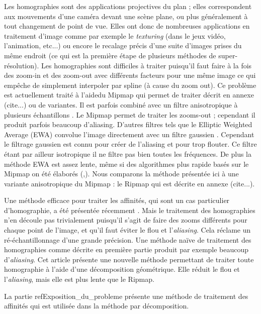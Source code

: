 Les homographies sont des applications projectives du plan ; elles correspondent aux mouvements d'une caméra devant une scène plane, ou plus généralement à tout changement de point de vue. Elles ont donc de nombreuses applications en traitement d'image comme par exemple le \emph{texturing} \cite{heckbert1983texture} (dans le jeux vidéo, l'animation, etc...) ou encore le recalage précis d'une suite d'images prises du même endroit \cite{brown2007automatic} (ce qui est la première étape de plusieurs méthodes de super-résolution). Les homographies sont difficiles à traiter puisqu'il faut faire à la fois des zoom-in et des zoom-out avec différents facteurs pour une même image ce qui empêche de simplement interpoler par spline (à cause du zoom out).  Ce problème est actuellement traité à l'aidedu Mipmap qui permet de traiter \cite{williams1983pyramidal} décrit en annexe (cite...) ou de variantes. Il est parfois combiné avec un filtre anisotropique à plusieurs échantillons  \cite{barkans1997high}. Le Mipmap permet de traiter les zooms-out ; cependant il produit parfois beaucoup d'aliasing.  D'autres filtres tels que le Elliptic Weighted Average (EWA) convolue l'image directement avec un filtre gaussien \cite{greene1986creating}. Cependant le filtrage gaussien est connu pour créer de l'aliasing et pour trop flouter. Ce filtre étant par ailleur isotropique il ne filtre pas bien toutes les fréquences. De plus la méthode EWA est assez lente, même si des algorithmes plus rapide basés sur le Mipmap on été élaborés (\cite{mccormack1999feline},\cite{huttner1999fast}). Nous comparons la méthode présentée ici à une variante anisotropique du Mipmap : le Ripmap \cite{akenine2008real} qui est décrite en annexe (cite...).

	Une méthode efficace pour traiter les affinités, qui sont un cas particulier d'homographie, a été présentée récemment \cite{szeliski2010high}. Mais le traitement des homographies n'en découle pas trivialement puisqu'il s'agit de faire des zooms différents pour chaque point de l'image, et qu'il faut éviter le flou et l'\emph{aliasing}. Cela réclame un ré-échantillonnage d'une grande précision. Une méthode naïve de traitement des homographies comme décrite en première partie produit par exemple beaucoup d'\emph{aliasing}. Cet article présente une nouvelle méthode permettant de traiter toute homographie à l'aide d'une décomposition géométrique. Elle réduit le flou et l'\emph{aliasing}, mais elle est plus lente que le Ripmap.

	La partie ref{Exposition_du_probleme} présente une méthode de traitement des affinités qui est utilisée dans la méthode par décomposition.

